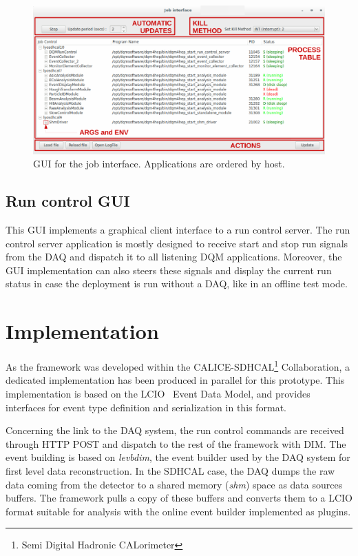 \documentclass[conference]{IEEEtran}
\begin{document}
\begin{figure}[htbp]
  \begin{center}
    \includegraphics[width=.95\textwidth]{figs/JobControlInterface.pdf}
    \caption{\label{fig:JobControlGUI} GUI for the job interface. Applications are ordered by host.}
  \end{center}
\end{figure}

\subsection{Run control GUI}

This GUI implements a graphical client interface to a run control server. The run control server application is mostly designed to receive start and stop run signals from the DAQ and dispatch it to all listening DQM applications. Moreover, the GUI implementation can also steers these signals and display the current run status in case the deployment is run without a DAQ, like in an offline test mode.

\section{Implementation}

As the framework was developed within the CALICE-SDHCAL\footnote{Semi Digital Hadronic CALorimeter} Collaboration, a dedicated implementation has been produced in parallel for this prototype. This implementation is based on the LCIO~\cite{LCIO} Event Data Model, and provides interfaces for event type definition and serialization in this format.


Concerning the link to the DAQ system, the run control commands are received through HTTP POST and dispatch to the rest of the framework with DIM. The event building is based on \textit{levbdim}, the event builder used by the DAQ system for first level data reconstruction. In the SDHCAL case, the DAQ dumps the raw data coming from the detector to a shared memory (\textit{shm}) space as data sources buffers. The framework pulls a copy of these buffers and converts them to a LCIO format suitable for analysis with the online event builder implemented as plugins.
\end{document}
